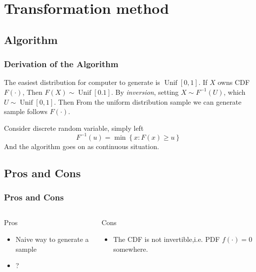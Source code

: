 \section{Transformation method}
\subsection{Algorithm}

\begin{frame}
    \frametitle{Derivation of the Algorithm}

    The easiest distribution for computer to generate is \(\operatorname{Unif}[0,1]\). If \(X\) owns CDF \(F(\cdot)\), Then \(F(X) \sim \operatorname{Unif}[0.1]\). By \textit{inversion}, setting \(X \sim F^{-1}(U)\), which \(U \sim \operatorname{Unif}[0,1]\). Then From the uniform distribution sample we can generate sample follows \(F(\cdot)\).
    \vspace*{1em}

    Consider discrete random variable, simply left
    \[F^{-1} (u) = \min\left\{x:F(x)\geq u\right\}\]
    And the algorithm goes on as continuous situation.

\end{frame}
\subsection{Pros and Cons}
\begin{frame}
    \frametitle{Pros and Cons}
    \begin{columns}
        \begin{block}{Pros}
            \begin{itemize}
                \item Naive way to generate a sample
                \item ?
            \end{itemize}
        \end{block}
        
        \begin{block}{Cons}
            \begin{itemize}
                \item The CDF is not invertible,i.e. PDF \(f(\cdot) = 0\) somewhere.
            \end{itemize}
        \end{block}

        
    \end{columns}
    
\end{frame}
